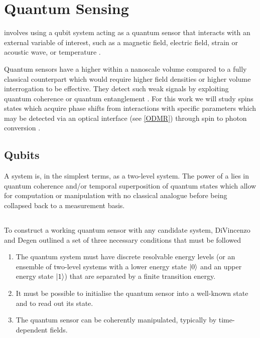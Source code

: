 \section{Quantum Sensing}
 involves using a qubit system acting as a quantum sensor that interacts with an external variable of
interest, such as a magnetic field, electric field, strain or acoustic wave, or temperature \cite{Castelletto_2024}. 

Quantum sensors have a higher  within a nanoscale volume compared to a fully classical counterpart which would require higher field densities or higher volume interrogation to be effective. 
They detect such weak signals by exploiting quantum coherence or quantum entanglement
\cite{Kin2021}
.
For this work we will study spins states which acquire phase shifts from interactions with specific parameters which may be detected via an optical interface (see \ref{ODMR}) through spin to photon conversion
\cite{Wolfowicz2021}
. 


\subsection{Qubits}
A  system is, in the simplest terms, as a two-level system. The power of a  lies in quantum coherence and/or
temporal superposition of quantum states which allow for computation or manipulation with no classical analogue before being collapsed back to a measurement basis. 

\subsection{}
To construct a working quantum sensor with any candidate system, DiVincenzo and Degen outlined a set of three necessary conditions that must be followed \cite{Crawford2021, RevModPhys.89.035002, DiVincenzo1995}

\begin{enumerate}
    \item The quantum system must have discrete resolvable energy levels (or an ensemble of two-level systems with a lower energy state $\ket{0}$ and an upper energy state $\ket{1}$) that are separated by a finite transition energy. 
    \item It must be possible to initialise the quantum sensor into a well-known state and to read out its state. 
    \item The quantum sensor can be coherently manipulated, typically by time-dependent fields.
\end{enumerate} 

